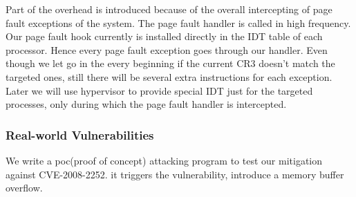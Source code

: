 


Part of the overhead is introduced because of the overall intercepting of page fault exceptions of the system. The page fault handler is called in high frequency. Our page fault hook currently is installed directly in the IDT table of each processor. Hence every page fault exception goes through our handler. Even though we let go in the every beginning if the current CR3 doesn't match the targeted ones, still there will be several extra instructions for each exception. Later we will use hypervisor to provide special IDT just for the targeted processes, only during which the page fault handler is intercepted.


\subsubsection{Real-world Vulnerabilities}

We write a poc(proof of concept) attacking program to test our mitigation against CVE-2008-2252. it triggers the vulnerability, introduce a memory buffer overflow. 


